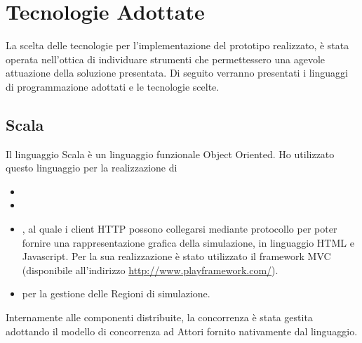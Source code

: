 \chapter{Tecnologie Adottate}

La scelta delle tecnologie per l'implementazione del prototipo realizzato, è stata operata nell'ottica di individuare strumenti che permettessero una agevole attuazione della soluzione presentata. 
Di seguito verranno presentati i linguaggi di programmazione adottati e le tecnologie scelte.

	\section{Scala}
		Il linguaggio Scala è un linguaggio funzionale Object Oriented. Ho utilizzato questo linguaggio per la realizzazione di 
			\begin{itemize}
				\item {}
				\item {}
				\item {}, al quale i client HTTP possono collegarsi mediante protocollo  per poter fornire una rappresentazione grafica della simulazione, in linguaggio HTML e Javascript. Per la sua realizzazione è stato utilizzato il framework MVC  (disponibile all'indirizzo \url{http://www.playframework.com/}).
				\item {} per la gestione delle Regioni di simulazione.
			\end{itemize}
		Internamente alle componenti distribuite, la concorrenza è stata gestita adottando il modello di concorrenza ad Attori fornito nativamente dal linguaggio. 
		
